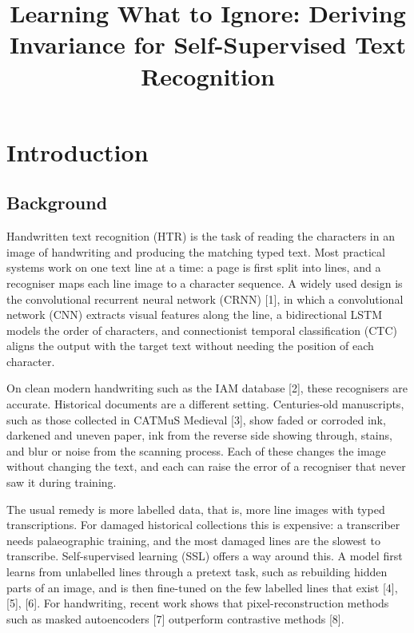 \documentclass[
  12pt,
  a4paper,
]{report}
\title{Learning What to Ignore: Deriving Invariance for Self-Supervised
Text Recognition}
\author{}
\date{}
\begin{document}
\maketitle

{
\setcounter{tocdepth}{2}
\tableofcontents
}
\listoffigures
\listoftables
\chapter{Introduction}\label{introduction}

\section{Background}\label{background}

Handwritten text recognition (HTR) is the task of reading the characters
in an image of handwriting and producing the matching typed text. Most
practical systems work on one text line at a time: a page is first split
into lines, and a recogniser maps each line image to a character
sequence. A widely used design is the convolutional recurrent neural
network (CRNN) {[}1{]}, in which a convolutional network (CNN) extracts
visual features along the line, a bidirectional LSTM models the order of
characters, and connectionist temporal classification (CTC) aligns the
output with the target text without needing the position of each
character.

On clean modern handwriting such as the IAM database {[}2{]}, these
recognisers are accurate. Historical documents are a different setting.
Centuries-old manuscripts, such as those collected in CATMuS Medieval
{[}3{]}, show faded or corroded ink, darkened and uneven paper, ink from
the reverse side showing through, stains, and blur or noise from the
scanning process. Each of these changes the image without changing the
text, and each can raise the error of a recogniser that never saw it
during training.

The usual remedy is more labelled data, that is, more line images with
typed transcriptions. For damaged historical collections this is
expensive: a transcriber needs palaeographic training, and the most
damaged lines are the slowest to transcribe. Self-supervised learning
(SSL) offers a way around this. A model first learns from unlabelled
lines through a pretext task, such as rebuilding hidden parts of an
image, and is then fine-tuned on the few labelled lines that exist
{[}4{]}, {[}5{]}, {[}6{]}. For handwriting, recent work shows that
pixel-reconstruction methods such as masked autoencoders {[}7{]}
outperform contrastive methods {[}8{]}.
\end{document}
